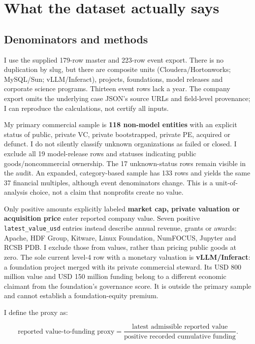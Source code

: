 \documentclass{article}
\begin{document}
\section{What the dataset actually
says}\label{what-the-dataset-actually-says}

\subsection{Denominators and methods}\label{denominators-and-methods}

I use the supplied 179-row master and 223-row event export. There is no
duplication by slug, but there are composite units
(Cloudera/Hortonworks; MySQL/Sun; vLLM/Inferact), projects, foundations,
model releases and corporate science programs. Thirteen event rows lack
a year. The company export omits the underlying case JSON's source URLs
and field-level provenance; I can reproduce the calculations, not
certify all inputs. \citep{InputData,InputSchema}

My primary commercial sample is \textbf{118 non-model entities} with an
explicit status of public, private VC, private bootstrapped, private PE,
acquired or defunct. I do not silently classify unknown organizations as
failed or closed. I exclude all 19 model-release rows and statuses
indicating public goods/noncommercial ownership. The 17 unknown-status
rows remain visible in the audit. An expanded, category-based sample has
133 rows and yields the same 37 financial multiples, although event
denominators change. This is a unit-of-analysis choice, not a claim that
nonprofits create no value.

Only positive amounts explicitly labeled \textbf{market cap, private
valuation or acquisition price} enter reported company value. Seven
positive \texttt{latest\_value\_usd} entries instead describe annual
revenue, grants or awards: Apache, HDF Group, Kitware, Linux Foundation,
NumFOCUS, Jupyter and RCSB PDB. I exclude those from values, rather than
pricing public goods at zero. The sole current level-4 row with a
monetary valuation is \textbf{vLLM/Inferact}: a foundation project
merged with its private commercial steward. Its USD 800 million value
and USD 150 million funding belong to a different economic claimant from
the foundation's governance score. It is outside the primary sample and
cannot establish a foundation-equity premium.

I define the proxy as:

\[\text{reported value-to-funding proxy} = \frac{\text{latest admissible reported value}}{\text{positive recorded cumulative funding}}.\]
\end{document}
